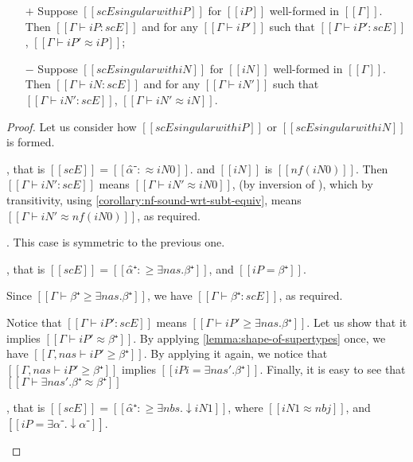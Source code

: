 \begin{lemma}
    \label{lemma:entry-singularity-soundness}
    \begin{itemize}
        \item [$+$] Suppose $[[scE singular with iP]]$ for $[[iP]]$ well-formed in $[[Γ]]$.
            Then $[[ Γ ⊢ iP : scE ]]$
            and for any $[[ Γ ⊢ iP']]$ such that $[[Γ ⊢ iP' : scE]]$, $[[Γ ⊢ iP' ≈ iP]]$;
        \item [$-$] Suppose $[[scE singular with iN]]$ for $[[iN]]$ well-formed in $[[Γ]]$.
            Then $[[ Γ ⊢ iN : scE ]]$
            and for any $[[ Γ ⊢ iN']]$ such that $[[Γ ⊢ iN' : scE]]$, $[[Γ ⊢ iN' ≈ iN]]$.
    \end{itemize}
\end{lemma}
\begin{proof}
    Let us consider how $[[scE singular with iP]]$ or $[[scE singular with iN]]$ is formed.
    \begin{caseof}
        \item {}, that is $[[scE]] = [[α̂⁻ :≈ iN0]]$.
            and $[[iN]]$ is $[[nf(iN0)]]$.
            Then $[[Γ ⊢ iN' : scE]]$ means $[[Γ ⊢ iN' ≈ iN0]]$, 
            (by inversion of ),
            which by transitivity, using \cref{corollary:nf-sound-wrt-subt-equiv},
            means $[[Γ ⊢ iN' ≈ nf(iN0)]]$, 
            as required.
        \item {}. This case is symmetric to the previous one.

        \item {}, that is 
            $[[scE]] = [[α̂⁺ :≥ ∃nas.β⁺]]$, and $[[iP = β⁺]]$.

            Since $[[Γ ⊢ β⁺ ≥  ∃nas.β⁺]]$, we have $[[Γ ⊢ β⁺ : scE ]]$, 
            as required.

            Notice that $[[Γ ⊢ iP' : scE]]$ means $[[Γ ⊢ iP' ≥ ∃nas.β⁺]]$.
            Let us show that it implies $[[Γ ⊢ iP' ≈ β⁺]]$.
            By applying \cref{lemma:shape-of-supertypes} once, 
            we have $[[Γ, nas ⊢ iP' ≥ β⁺]]$.
            By applying it again, we notice that
            $[[Γ, nas ⊢ iP' ≥ β⁺]]$ implies $[[iPi = ∃nas'.β⁺]]$.
            Finally, it is easy to see that $[[Γ ⊢ ∃nas'.β⁺ ≈ β⁺]]$

        \item {},
            that is $[[scE]] = [[α̂⁺ :≥ ∃nbs.↓iN1]]$, 
            where $[[iN1 ≈ nbj]]$, and $[[iP = ∃α⁻.↓α⁻]]$.


\end{caseof}
\end{proof}

